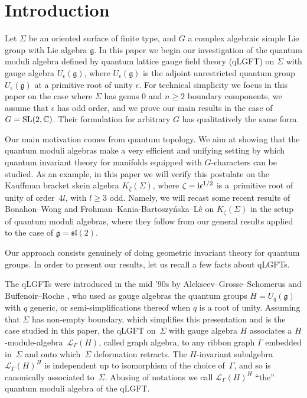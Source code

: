 \documentclass[pdftex]{sigma}%
\numberwithin{equation}{section}
\numberwithin{figure}{section}
\newcommand{\e}{\epsilon}
\newcommand{\mc}{\mathbb{C}}
\newcommand{\Ll}{{\mathcal L}}
\begin{document}


\section{Introduction}%

Let $\Sigma$ be an oriented surface of finite type, and $G$ a complex algebraic simple Lie group with Lie algebra $\mathfrak{g}$. In this paper we begin our investigation of the quantum moduli algebra defined by quantum lattice gauge field theory (qLGFT) on $\Sigma$ with gauge algebra $U_\e(\mathfrak{g})$, where $U_\e(\mathfrak{g})$ is the adjoint unrestricted quantum group $U_\e(\mathfrak{g})$ at a primitive root of unity $\e$. For technical simplicity we focus in this paper on the case where $\Sigma$ has genus $0$ and $n\geq 2$ boundary components, we assume that $\e$ has odd order, and we prove our main results in the case of $G = {\rm SL}(2,\mc)$. Their formulation for arbitrary $G$ has qualitatively the same form.

 Our main motivation comes from quantum topology. We aim at showing that the quantum moduli algebras make a very efficient and unifying setting by which quantum invariant theory for manifolds equipped with $G$-characters can be studied. As an example, in this paper we will verify this postulate on the Kauffman bracket skein algebra $K_\zeta(\Sigma)$, where $\zeta = {\rm i}\e^{1/2}$ is a~primitive root of unity of order~$4l$, with $l\geq 3$ odd. Namely, we will recast some recent results of Bonahon--Wong \cite{BW1,BW2} and Frohman--Kania-Bartoszy\'nska--L\^e \cite{FKL, FKL2} on $K_\zeta(\Sigma)$ in the setup of quantum moduli algebras, where they follow from our general results applied to the case of $\mathfrak{g}={\mathfrak{sl}}(2)$.

Our approach consists genuinely of doing geometric invariant theory for quantum groups. In order to present our results, let us recall a few facts about qLGFTs.

 The qLGFTs were introduced in the mid '$90$s by Alekseev--Grosse--Schomerus \cite{A,AGS1,AGS2,AS} and Buffenoir--Roche \cite{BR1,BR2}, who used as gauge algebras the quantum groups $H=U_q(\mathfrak{g})$ with $q$ generic, or semi-simplifications thereof when $q$ is a root of unity. Assuming that $\Sigma$ has non-empty boundary, which simplifies this presentation and is the case studied in this paper, the qLGFT on~$\Sigma$ with gauge algebra $H$ associates a $H$-module-algebra~$\Ll_\Gamma(H)$, called graph algebra, to any ribbon graph $\Gamma$ embedded in~$\Sigma$ and onto which~$\Sigma$ deformation retracts. The $H$-invariant subalgebra $\Ll_\Gamma(H)^H$ is independent up to isomorphism of the choice of~$\Gamma$, and so is canonically associated to~$\Sigma$. Abusing of notations we call $\Ll_\Gamma(H)^H$ ``the'' quantum moduli algebra of the qLGFT.
\end{document}
